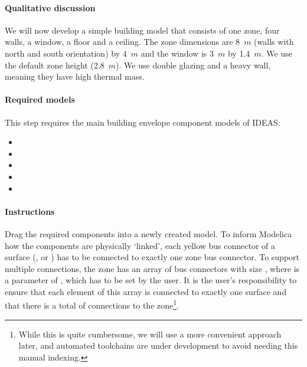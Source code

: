 \documentclass[10pt,a4paper]{article}
\begin{document}
\paragraph{Qualitative discussion}
We will now develop a simple building model that consists of one zone,
four walls, a window, a floor and a ceiling.
The zone dimensions are 8~$m$ (walls with north and south orientation) by 4~$m$ and the window is 3~$m$ by 1.4~$m$. We use the default zone height (2.8~$m$).
We use double glazing and a heavy wall, meaning they
have high thermal mass.

\paragraph{Required models}
This step requires the main building envelope component models of IDEAS:
\begin{itemize}
\item {}
\item {}
\item {}
\item {}
\item {}
\end{itemize}

\paragraph{Instructions}
Drag the required components into a newly created model. To inform Modelica how the components are physically `linked', each yellow bus connector of a surface (,  or ) has to be connected to exactly one zone bus connector.
To support multiple connections, the zone has an array of bus connectors with size , where  is a parameter of , which has to be set by the user. It is the user's responsibility to ensure that each element of this array is connected to exactly one surface and that there is a total of  connections to the zone\footnote{While this is quite cumbersome, we will use a more convenient approach later, and automated toolchains are under development to avoid needing this manual indexing.}.\\
\end{document}
